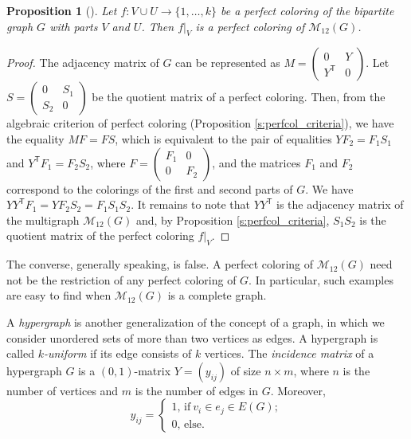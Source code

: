 \documentclass[11pt]{article}
\newtheorem{claim}{Proposition}[section]
\theoremstyle{definition}
\begin{document}
{{{\begin{claim}[\cite{PA20}]\label{bipartity}
Let $f:V\cup U \rightarrow \{1,\dots,k\}$ be a perfect coloring of the bipartite graph
$G$ with parts $V$ and $U$. Then $f|_V$ is a perfect coloring of
$\mathcal{M}_{12}(G)$. \end{claim}
\begin{proof}
The adjacency matrix of $G$ can be represented as
$M=\begin{pmatrix}
0 & Y \\
Y^{\mathsf T} & 0
\end{pmatrix}$. Let $S=\begin{pmatrix}
0 & S_1 \\
S_2 & 0
\end{pmatrix}$ be the quotient matrix  of a perfect coloring. Then, from the algebraic criterion of perfect coloring (Proposition \ref{s:perfcol_criteria}), we have the equality $MF=FS$,
which is equivalent to the pair of equalities $YF_2=F_1S_1$ and $Y^{\mathsf T}F_1=F_2S_2$, where $F=\begin{pmatrix}
F_1 & 0 \\
0 & F_2
\end{pmatrix}$, and the matrices $F_1$ and $F_2$ correspond to the
colorings of the first and second parts of  $G$. We have $YY^{\mathsf T}F_1=YF_2S_2=F_1S_1S_2$. It remains to note that 
$YY^{\mathsf T}$ is the adjacency matrix of the multigraph
$\mathcal{M}_{12}(G)$ and, by Proposition \ref{s:perfcol_criteria},
 $S_1S_2$ is the quotient matrix of the perfect coloring
$f|_V$.
\end{proof}

The converse, generally speaking, is false. A perfect coloring
of  $\mathcal{M}_{12}(G)$ need not be the restriction of any
perfect coloring of  $G$. In particular, such examples are easy to
find when $\mathcal{M}_{12}(G)$ is a complete graph.



A {\sl hypergraph} is another generalization of the concept of a graph,  in which we consider  unordered sets of more than two vertices  as edges. A hypergraph is called {\sl $k$-uniform} if  its edge consists of $k$ vertices. The {\sl incidence matrix} of a hypergraph $G$ is a $(0,1)$-matrix $Y=(y_{ij})$ of size $n\times m$, where $n$ is the number of vertices and $m$ is the number of edges in $G$. Moreover, 
\[
y_{ij}= \left\{
\begin{array}{l}
1 \mbox{, if}\ v_i\in e_j \in E(G);\\
0\mbox{, else}.
\end{array}
\right.
\]



}}}
\end{document}
